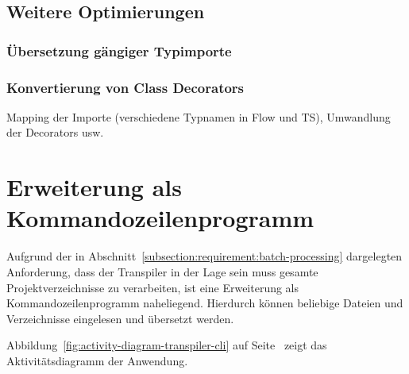   \subsection{Weitere Optimierungen}
    \subsubsection{Übersetzung gängiger Typimporte}
    \subsubsection{Konvertierung von Class Decorators}

  Mapping der Importe (verschiedene Typnamen in Flow und TS), Umwandlung der Decorators usw.

\section{Erweiterung als Kommandozeilenprogramm}

Aufgrund der in Abschnitt~\ref{subsection:requirement:batch-processing} dargelegten Anforderung, dass der Transpiler in der Lage sein muss gesamte Projektverzeichnisse zu verarbeiten, ist eine Erweiterung als Kommandozeilenprogramm naheliegend. Hierdurch können beliebige Dateien und Verzeichnisse eingelesen und übersetzt werden.


Abbildung~\ref{fig:activity-diagram-transpiler-cli} auf Seite~\pageref{fig:activity-diagram-transpiler-cli} zeigt das Aktivitätsdiagramm der Anwendung.

